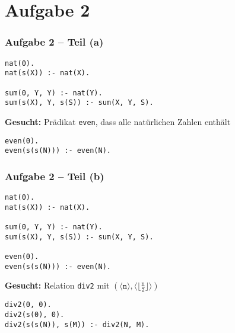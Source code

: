 \documentclass{beamer}
\newcommand{\num}[1]{\ensuremath{\langle #1 \rangle}}
\begin{document}


\section{Aufgabe 2}

\begin{frame}[fragile] \frametitle{Aufgabe 2 -- Teil (a)}
	\footnotesize
	\begin{lstlisting}
nat(0).
nat(s(X)) :- nat(X).

sum(0, Y, Y) :- nat(Y).
sum(s(X), Y, s(S)) :- sum(X, Y, S).
	\end{lstlisting}
	
	\textbf{Gesucht:} Prädikat \texttt{even}, dass alle natürlichen Zahlen enthält
	
	\pause
	
	\begin{lstlisting}[firstnumber=7]
even(0).
even(s(s(N))) :- even(N).
	\end{lstlisting}
\end{frame}

\begin{frame}[fragile] \frametitle{Aufgabe 2 -- Teil (b)}
	\footnotesize
	\begin{lstlisting}
nat(0).
nat(s(X)) :- nat(X).

sum(0, Y, Y) :- nat(Y).
sum(s(X), Y, s(S)) :- sum(X, Y, S).

even(0).
even(s(s(N))) :- even(N).
	\end{lstlisting}
	
	\textbf{Gesucht:} Relation \texttt{div2} mit $(\num{\texttt{n}} , \num{\lfloor \frac{\texttt{n}}{\texttt{2}} \rfloor})$
	
	\pause
	
	\begin{lstlisting}[firstnumber=10]
div2(0, 0).
div2(s(0), 0).
div2(s(s(N)), s(M)) :- div2(N, M).
	\end{lstlisting}
\end{frame}
\end{document}

